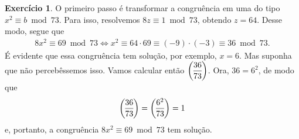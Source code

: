 \documentclass[a4paper,12pt]{article}
\theoremstyle{definition}
\newtheorem{exercise}{Exercício}%
\newcommand{\genlegendre}[4]{%
	\genfrac{(}{)}{}{#1}{#3}{#4}%
	\if\relax\detokenize{#2}\relax\else_{\!#2}\fi
}
\newcommand{\legendre}[3][]{\genlegendre{}{#1}{#2}{#3}}
\begin{document}
	\begin{exercise}
		O primeiro passo é transformar a congruência em uma do tipo $x^2\equiv b \bmod 73$. Para isso, resolvemos $8z\equiv 1\bmod 73$, obtendo $z = 64$. Desse modo, segue que
		\begin{align*}
		8x^2\equiv 69\bmod 73 \Longleftrightarrow x^2\equiv 64\cdot 69\equiv (-9)\cdot(-3) \equiv 36\bmod 73.
		\end{align*}
		É evidente que essa congruência tem solução, por exemplo, $x=6$. Mas suponha que não percebêssemos isso. Vamos calcular então $\displaystyle{\legendre[]{36}{73}}$. Ora, $36=6^2$, de modo que
		\begin{align*}
		\legendre[]{36}{73} = \legendre[]{6^2}{73} = 1
		\end{align*}
		e, portanto, a congruência $8x^2\equiv 69\bmod 73$ tem solução.
	\end{exercise}
\end{document}
